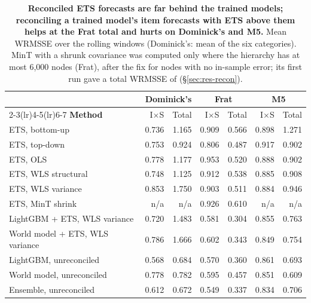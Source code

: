 \begin{table}[t]
\centering
\caption{\textbf{Reconciled ETS forecasts are far behind the trained models; reconciling a trained model's item
forecasts with ETS above them helps at the Frat total and hurts on Dominick's and M5.} Mean WRMSSE over the rolling
windows (Dominick's: mean of the six categories). MinT with a shrunk
covariance was computed only where the hierarchy has at most 6,000 nodes (Frat), after the fix for nodes with no
in-sample error; its first run gave a total WRMSSE of 
(\S\ref{sec:res-recon}).}
\label{tab:reconcile}
\footnotesize
\setlength{\tabcolsep}{3pt}
\begin{tabular}{l*{6}{r}}
\toprule
 & \multicolumn{2}{c}{\textbf{Dominick's}} & \multicolumn{2}{c}{\textbf{Frat}} & \multicolumn{2}{c}{\textbf{M5}} \\
\cmidrule(lr){2-3}\cmidrule(lr){4-5}\cmidrule(lr){6-7}
\textbf{Method} & I$\times$S & Total & I$\times$S & Total & I$\times$S & Total \\
\midrule
ETS, bottom-up & 0.736 & 1.165 & 0.909 & 0.566 & 0.898 & 1.271 \\
ETS, top-down & 0.753 & 0.924 & 0.806 & 0.487 & 0.917 & 0.902 \\
ETS, OLS & 0.778 & 1.177 & 0.953 & 0.520 & 0.888 & 0.902 \\
ETS, WLS structural & 0.748 & 1.125 & 0.912 & 0.538 & 0.885 & 0.908 \\
ETS, WLS variance & 0.853 & 1.750 & 0.903 & 0.511 & 0.884 & 0.946 \\
ETS, MinT shrink & n/a & n/a & 0.926 & 0.610 & n/a & n/a \\
LightGBM + ETS, WLS variance & 0.720 & 1.483 & 0.581 & 0.304 & 0.855 & 0.763 \\
World model + ETS, WLS variance & 0.786 & 1.666 & 0.602 & 0.343 & 0.849 & 0.754 \\
\midrule
LightGBM, unreconciled & 0.568 & 0.684 & 0.570 & 0.360 & 0.861 & 0.693 \\
World model, unreconciled & 0.778 & 0.782 & 0.595 & 0.457 & 0.851 & 0.609 \\
Ensemble, unreconciled & 0.612 & 0.672 & 0.549 & 0.337 & 0.834 & 0.706 \\
\bottomrule
\end{tabular}
\end{table}
